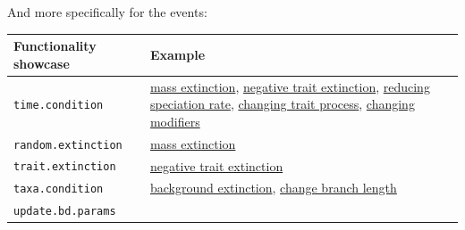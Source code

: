 \documentclass[
]{book}
\begin{document}
And more specifically for the events:

\begin{longtable}[]{@{}ll@{}}
\toprule
\begin{minipage}[b]{0.55\columnwidth}\raggedright
Functionality showcase\strut
\end{minipage} & \begin{minipage}[b]{0.39\columnwidth}\raggedright
Example\strut
\end{minipage}\tabularnewline
\midrule
\endhead
\begin{minipage}[t]{0.55\columnwidth}\raggedright
\texttt{time.condition}\strut
\end{minipage} & \begin{minipage}[t]{0.39\columnwidth}\raggedright
\protect\hyperlink{EGrandom_ext}{mass extinction}, \protect\hyperlink{EGneg_ext}{negative trait extinction}, \protect\hyperlink{EGred_spec}{reducing speciation rate}, \protect\hyperlink{EG_change_trait}{changing trait process}, \protect\hyperlink{EG_change_modif}{changing modifiers}\strut
\end{minipage}\tabularnewline
\begin{minipage}[t]{0.55\columnwidth}\raggedright
\texttt{random.extinction}\strut
\end{minipage} & \begin{minipage}[t]{0.39\columnwidth}\raggedright
\protect\hyperlink{EGrandom_ext}{mass extinction}\strut
\end{minipage}\tabularnewline
\begin{minipage}[t]{0.55\columnwidth}\raggedright
\texttt{trait.extinction}\strut
\end{minipage} & \begin{minipage}[t]{0.39\columnwidth}\raggedright
\protect\hyperlink{EGneg_ext}{negative trait extinction}\strut
\end{minipage}\tabularnewline
\begin{minipage}[t]{0.55\columnwidth}\raggedright
\texttt{taxa.condition}\strut
\end{minipage} & \begin{minipage}[t]{0.39\columnwidth}\raggedright
\protect\hyperlink{EGbg_ext}{background extinction}, \protect\hyperlink{EG_modify_brlen}{change branch length}\strut
\end{minipage}\tabularnewline
\begin{minipage}[t]{0.55\columnwidth}\raggedright
\texttt{update.bd.params}\strut
\end{minipage} & \begin{minipage}[t]{0.39\columnwidth}\raggedright

\end{minipage}
\end{longtable}
\end{document}
